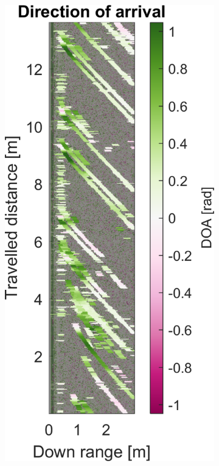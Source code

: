 \begin{figure}[htbp]
\begin{subfigure}[t]{0.475\linewidth}
    \end{subfigure}\bigskip\\
    \begin{subfigure}[t]{0.475\linewidth}
        \centering
        \includegraphics[width=\linewidth,max height=.475\textheight]{gfx/results/publicrestroom_doa.png}

\end{subfigure}
\end{figure}
